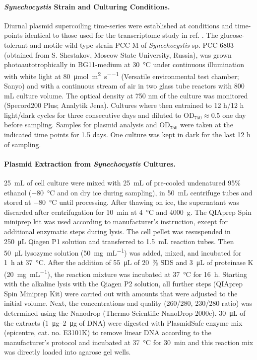 \documentclass[10pt,a4]{article}
\def\cite#1{\hypersetup{citecolor=Teal}\citep{#1}} %
\newcommand{\photons}{\micro\mol\per\square\meter\per\second}
\newcommand{\mL}{\milli\liter}
\newcommand{\scyst}{\textit{Synechocystis}}
\newcommand{\OD}{\ensuremath{\text{OD}_{750}}}
\begin{document}
\paragraph{\scyst{} Strain and Culturing Conditions.}
Diurnal plasmid supercoiling time-series were established at
conditions and time-points identical to those used for the
transcriptome study in ref. \cite{Lehmann2013, Beck2014}.  The
glucose-tolerant and motile wild-type strain PCC-M of
\textit{Synechocystis} sp. PCC 6803 (obtained from S.  Shestakov,
Moscow State University, Russia), was grown photoautotrophically in
BG11-medium at \SI{30}{\celsius} under continuous illumination with
white light at \SI{80}{\photons} (Versatile environmental test
chamber; Sanyo) and with a continuous stream of air in two 
glass tube reactors with 800 mL culture volume.  The optical
density at 750 nm of the culture was monitored (Specord200 Plus;
Analytik Jena). Cultures where then entrained to 12 h/12 h light/dark
cycles for three consecutive days and diluted to $\OD{}\approx 0.5$
one day before sampling. Samples for plasmid analysis and \OD{} were
taken at the indicated time points for 1.5 days. One culture was
kept in dark for the last 12 h of sampling.

\paragraph{Plasmid Extraction from \scyst{} Cultures.}
\SI{25}{\mL} of cell culture were mixed with \SI{25}{\mL} of
pre-cooled undenatured 95\% ethanol (\SI{-80}{\celsius} and on dry ice
during sampling), in \SI{50}{\mL} centrifuge tubes and stored at
\SI{-80}{\celsius} until processing. After thawing on ice, the
supernatant was discarded after centrifugation for \SI{10}{\minute} at
\SI{4}{\celsius} and \SI{4000}{g}. The QIAprep Spin miniprep kit was
used according to manufacturer's instruction, except for additional
enzymatic steps during lysis. The cell pellet was resuspended in
\SI{250}{\micro\liter} Qiagen P1 solution and transferred to
\SI{1.5}{\mL} reaction tubes. Then \SI{50}{\micro\liter} lysozyme
solution (\SI{50}{\milli\gram\per\milli\liter}) was added, mixed, and
incubated for \SI{1}{\hour} at \SI{37}{\celsius}.  After the addition
of \SI{55}{\micro\liter} of \SI{20}{\percent} SDS and
\SI{3}{\micro\liter} of proteinase K
(\SI{20}{\milli\gram\per\milli\liter}), the reaction mixture was
incubated at \SI{37}{\celsius} for \SI{16}{\hour}.  Starting with the
alkaline lysis with the Qiagen P2 solution, all further steps (QIAprep
Spin Miniprep Kit) were carried out with amounts that were adjusted to
the initial volume. Next, the concentrations and quality (260/280,
230/280 ratio) was determined using the Nanodrop (Thermo Scientific
NanoDrop 2000c).  \SI{30}{\uL} of the extracts (\SIrange{1}{2}{\ug} of
DNA) were digested with PlasmidSafe enzyme mix (epicentre,
cat. no. E3101K) to remove linear DNA according to the manufacturer's
protocol and incubated at \SI{37}{\celsius} for \SI{30}{\minute} and
this reaction mix was directly loaded into agarose gel wells.
\end{document}
